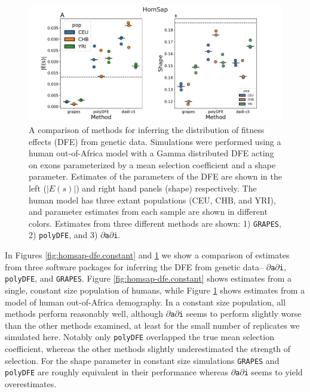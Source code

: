 \documentclass[hidelinks]{article}
\newcommand{\polydfe}{\texttt{polyDFE}\xspace}
\newcommand{\dadi}{$\partial$\texttt{a}$\partial$\texttt{i}\xspace}
\newcommand{\grapes}{\texttt{GRAPES}\xspace}
\begin{document}
    \begin{figure}[htbp]
        \centering
        \includegraphics[width=\linewidth]{figures/HomSap/OOA/HomSap_OutOfAfricaArchaicAdmixture_5R19_Gamma_K17_ensembl_havana_104_exons_DFE_plot}
        \caption{A comparison of methods for inferring the distribution of fitness effects (DFE) from genetic data.
        Simulations were performed using a human out-of-Africa model \citep{ragsdale2019models} with a Gamma distributed DFE
        acting on exons parameterized by a mean selection coefficient and a shape parameter. Estimates of the 
        parameters of the DFE are shown in the left ($\lvert E(s) \rvert $) and right hand panels (shape) respectively.
        The human model has three extant populations (CEU, CHB, and YRI), and parameter estimates from each
        sample are shown in different colors.
        Estimates from three different methods are shown: 1) \grapes \cite{galtier2016adaptive}, 2) \polydfe \citep{tataru2020polydfe},
        and 3) \dadi \citep{gutenkunst2009inferring}.}
        \label{fig:homsap-dfe.ooa}
    \end{figure}

    In Figures \ref{fig:homsap-dfe.constant} and \ref{fig:homsap-dfe.ooa} we show a comparison of estimates
    from three software packages for inferring the DFE from genetic data-- 
    \dadi \citep{gutenkunst2009inferring}, \polydfe \citep{tataru2020polydfe}, 
    and \grapes \citep{galtier2016adaptive}. 
    Figure \ref{fig:homsap-dfe.constant} shows estimates from a single, constant size population of humans, 
    while Figure \ref{fig:homsap-dfe.ooa} shows estimates from a model of human out-of-Africa demography.
    In a constant size population, all methods perform reasonably well, although \dadi seems to
    perform slightly worse than the other methods examined, at least for the small number of replicates we simulated here.
    Notably only \polydfe overlapped the true mean selection coefficient, whereas 
    the other methods slightly underestimated the strength of selection. 
    For the shape parameter in constant size simulations \grapes and \polydfe are roughly
    equivalent in their performance whereas \dadi seems to yield overestimates. 
    
\end{document}
